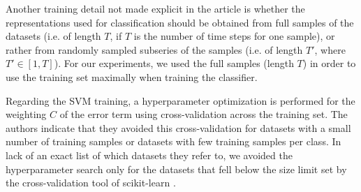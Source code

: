 Another training detail not made explicit in the article is whether the representations used for classification should be obtained from full samples of the datasets (i.e. of length $T$, if $T$ is the number of time steps for one sample), or rather from randomly sampled subseries of the samples (i.e. of length $T'$, where $T' \in [1,T]$). For our experiments, we used the full samples (length $T$) in order to use the training set maximally when training the classifier.

Regarding the SVM training, a hyperparameter optimization is performed for the weighting $C$ of the error term using cross-validation across the training set. The authors indicate that they avoided this cross-validation for datasets with a small number of training samples or datasets with few training samples per class. In lack of an exact list of which datasets they refer to, we avoided the hyperparameter search only for the datasets that fell below the size limit set by the cross-validation tool of scikit-learn \cite{scikit-learn}.



